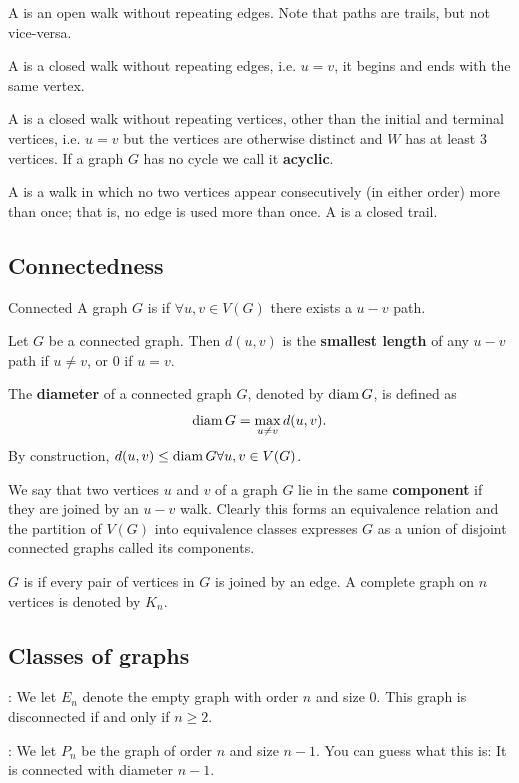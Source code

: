 A  is an open walk without repeating edges.
Note that paths are trails, but not vice-versa.

A  is a closed walk without repeating edges, i.e. $u=v$, it begins and ends with the same vertex.

A  is a closed walk without repeating vertices, other than the initial and terminal vertices, i.e. $u=v$ but the vertices are otherwise distinct and $W$ has at least 3 vertices. If a graph $G$ has no cycle we call it \textbf{acyclic}.

A  is a walk in which no two vertices appear consecutively (in either order) more than once; that is, no edge is used more than once. A  is a closed trail.

\subsection{Connectedness}
\begin{defn}{Connected}{}
A graph $G$ is  if $\forall u,v \in V(G)$ there exists a $u-v$ path.
\end{defn}

Let $G$ be a connected graph. Then $d(u,v)$ is the \textbf{smallest length} of any $u-v$ path if $u \neq v$, or 0 if $u=v$.

The \textbf{diameter} of a connected graph $G$, denoted by $\operatorname{diam} G$, is defined as
\[ \operatorname{diam} G = \max_{u\neq v} d(u,v). \]
By construction, $d(u,v) \le \operatorname{diam} G \forall u,v \in V(G)$.

We say that two vertices $u$ and $v$ of a graph $G$ lie in the same \textbf{component} if they are joined by an $u-v$ walk. Clearly this forms an equivalence relation and the partition of $V(G)$ into equivalence classes expresses $G$ as a union of disjoint connected graphs called its components.

$G$ is  if every pair of vertices in $G$ is joined by an edge. A complete graph on $n$ vertices is denoted by $K_n$.

\subsection{Classes of graphs}
: We let $E_n$ denote the empty graph with order $n$ and size 0. This graph is disconnected if and only if $n \ge 2$.

: We let $P_n$ be the graph of order $n$ and size $n-1$. You can guess what this is: It is connected with diameter $n-1$.

